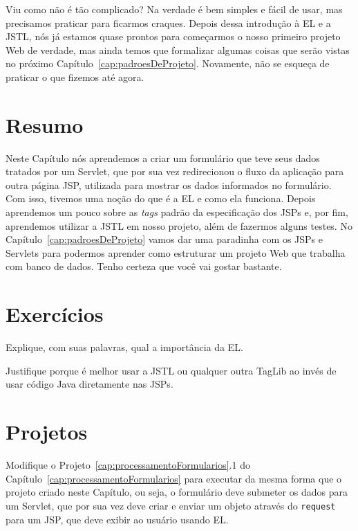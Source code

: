 Viu como não é tão complicado? Na verdade é bem simples e fácil de usar, mas precisamos praticar para ficarmos craques. Depois dessa introdução à EL e a JSTL, nós já estamos quase prontos para começarmos o nosso primeiro projeto Web de verdade, mas ainda temos que formalizar algumas coisas que serão vistas no próximo Capítulo~\ref{cap:padroesDeProjeto}. Novamente, não se esqueça de praticar o que fizemos até agora.  


\section{Resumo}

Neste Capítulo nós aprendemos a criar um formulário que teve seus dados tratados por um Servlet, que por sua vez redirecionou o fluxo da aplicação para outra página JSP, utilizada para mostrar os dados informados no formulário. Com isso, tivemos uma noção do que é a EL e como ela funciona. Depois aprendemos um pouco sobre as \textit{tags} padrão da especificação dos JSPs e, por fim, aprendemos utilizar a JSTL em nosso projeto, além de fazermos alguns testes. No Capítulo~\ref{cap:padroesDeProjeto} vamos dar uma paradinha com os JSPs e Servlets para podermos aprender como estruturar um projeto Web que trabalha com banco de dados. Tenho certeza que você vai gostar bastante.


\section{Exercícios}

\begin{exercicioSemArquivo}{}{}{}
    Explique, com suas palavras, qual a importância da EL.
\end{exercicioSemArquivo}

\begin{exercicioSemArquivo}{}{}{}
    Justifique porque é melhor usar a JSTL ou qualquer outra TagLib ao invés de usar código Java diretamente nas JSPs.
\end{exercicioSemArquivo}

\section{Projetos}

\begin{projetoSemArquivo}{}{}{}
    Modifique o Projeto~\ref{cap:processamentoFormularios}.1 do Capítulo~\ref{cap:processamentoFormularios} para executar da mesma forma que o projeto criado neste Capítulo, ou seja, o formulário deve submeter os dados para um Servlet, que por sua vez deve criar e enviar um objeto através do \texttt{request} para um JSP, que deve exibir ao usuário usando EL.
\end{projetoSemArquivo}

